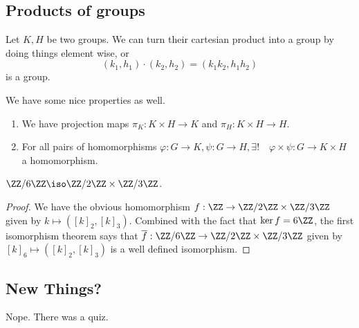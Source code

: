 \subsection{Products of groups}
Let $K, H$ be two groups. We can turn their cartesian product into a
group by doing things element wise, or
\[ (k_1, h_1) \cdot (k_2, h_2) = (k_1 k_2, h_1 h_2) \]
is a group.

We have some nice properties as well.
\begin{enumerate}
\item We have projection maps $\pi_K : K \times H \to K$ and $\pi_H : K
\times H \to H$.
\item For all pairs of homomorphisms $\varphi : G \to K, \psi : G \to
H, \exists ! \quad \varphi \times \psi : G \to K \times H$ a
homomorphism.
\end{enumerate}

\begin{ex}
$\ZZ / 6 \ZZ \iso \ZZ / 2 \ZZ \times \ZZ / 3 \ZZ$.
\end{ex}

\begin{proof}
We have the obvious
homomorphism $f : \ZZ \to \ZZ / 2 \ZZ \times \ZZ / 3 \ZZ$ given by $k
\mapsto ([k]_2, [k]_3)$. Combined with the fact that $\ker f = 6\ZZ$,
the first isomorphism theorem says that $\overline{f} : \ZZ / 6 \ZZ \to
\ZZ / 2 \ZZ \times \ZZ / 3 \ZZ$ given by $[k]_6 \mapsto ([k]_2, [k]_3)$
is a well defined isomorphism.
\end{proof}

\subsection{New Things?}
Nope. There was a quiz.
